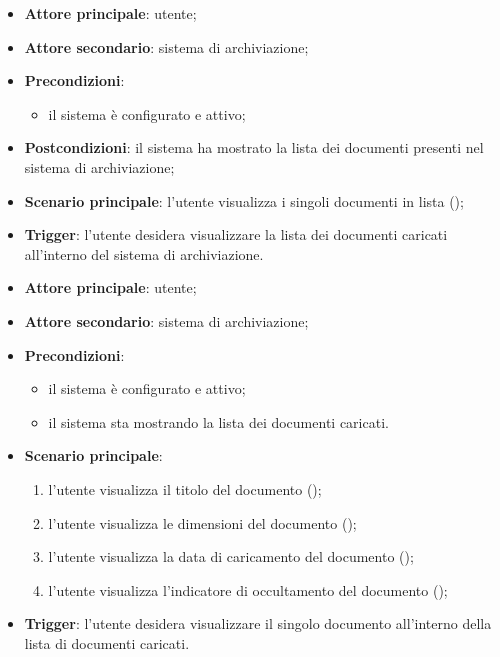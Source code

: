 \documentclass[10pt, a4paper]{article}
\begin{document}
    \begin{itemize}
        \item \textbf{Attore principale}: utente;
        \item \textbf{Attore secondario}: sistema di archiviazione;
        \item \textbf{Precondizioni}:
            \begin{itemize}
                \item il sistema è configurato e attivo;
            \end{itemize}
        \item \textbf{Postcondizioni}: il sistema ha mostrato la lista dei documenti presenti nel sistema di archiviazione;
        \item \textbf{Scenario principale}: l'utente visualizza i singoli documenti in lista ();
        \item \textbf{Trigger}: l’utente desidera visualizzare la lista dei documenti caricati all’interno del sistema di archiviazione.
    \end{itemize}

    \begin{itemize}
        \item \textbf{Attore principale}: utente;
        \item \textbf{Attore secondario}: sistema di archiviazione;
        \item \textbf{Precondizioni}:
            \begin{itemize}
                \item il sistema è configurato e attivo;
                \item il sistema sta mostrando la lista dei documenti caricati.
            \end{itemize}
        \item \textbf{Scenario principale}:
            \begin{enumerate}
                \item l'utente visualizza il titolo del documento ();
                \item l'utente visualizza le dimensioni del documento  ();
                \item l'utente visualizza la data di caricamento del documento ();
                \item l'utente visualizza l'indicatore di occultamento del documento ();
            \end{enumerate}
        \item \textbf{Trigger}: l’utente desidera visualizzare il singolo documento all’interno della lista di documenti caricati.
    \end{itemize}
\end{document}
